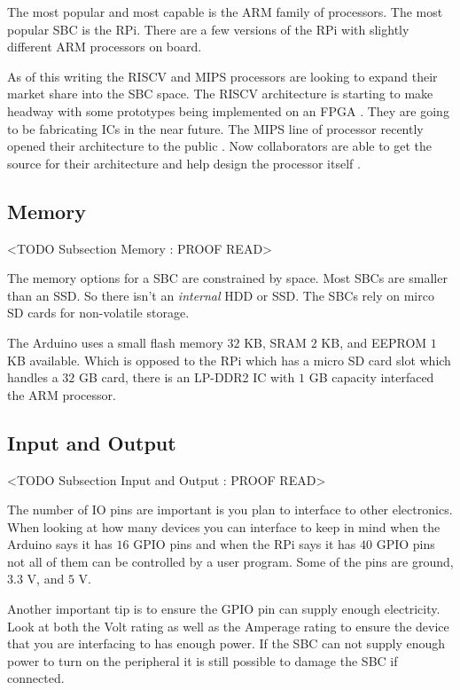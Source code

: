 The most popular and most capable is the \ac{ARM} family of processors. The most popular \ac{SBC} is the \ac{RPi}. There are a few versions of the \ac{RPi} with slightly different \ac{ARM} processors on board.

As of this writing the \ac{RISCV} and \ac{MIPS} processors are looking to expand their market share into the \ac{SBC} space. The \ac{RISCV} architecture is starting to make headway with some prototypes being implemented on an \ac{FPGA} \cite{}. They are going to be fabricating \ac{IC}s in the near future. The \ac{MIPS} line of processor recently opened their architecture to the public \cite{}. Now collaborators are able to get the source for their architecture and help design the processor itself \cite{}.
	
\subsection{Memory}
	<TODO Subsection Memory : PROOF READ>

The memory options for a \ac{SBC} are constrained by space. Most \ac{SBC}s are smaller than an \ac{SSD}. So there isn't an \emph{internal} \ac{HDD} or \ac{SSD}. The \ac{SBC}s rely on mirco \ac{SD} cards for non-volatile storage.

The Arduino uses a small flash memory $32$ \ac{KB}, \ac{SRAM} $2$ \ac{KB}, and \ac{EEPROM} $1$ \ac{KB} available. Which is opposed to the \ac{RPi} which has a micro \ac{SD} card slot which handles a $32$ \ac{GB} card, there is an \ac{LP}-\ac{DDR}2 \ac{IC} with $1$ \ac{GB} capacity interfaced the \ac{ARM} processor.
	
\subsection{Input and Output}
	<TODO Subsection Input and Output : PROOF READ>

The number of \ac{IO} pins are important is you plan to interface to other electronics. When looking at how many devices you can interface to keep in mind when the Arduino says it has $16$ \ac{GPIO} pins and when the \ac{RPi} says it has $40$ \ac{GPIO} pins not all of them can be controlled by a user program. Some of the pins are ground, $3.3$ \ac{V}, and $5$ \ac{V}.

Another important tip is to ensure the \ac{GPIO} pin can supply enough electricity. Look at both the Volt rating as well as the Amperage rating to ensure the device that you are interfacing to has enough power. If the \ac{SBC} can not supply enough power to turn on the peripheral it is still possible to damage the \ac{SBC} if connected.
	
